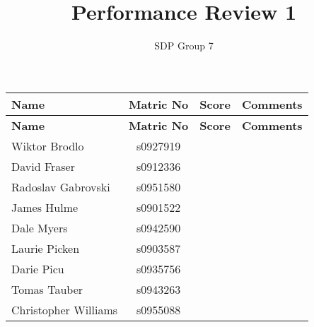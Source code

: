 \documentclass[10pt, a4paper]{article} %
\begin{document}
\title{Performance Review 1}
\author{SDP Group 7}
\maketitle

\begin{longtable}{l c c p{3cm}}
    \textbf{Name} &
    \textbf{Matric No} &
    \textbf{Score} &
    \textbf{Comments}\\
    \hline
    \endfirsthead


    \textbf{Name} &
    \textbf{Matric No} &
    \textbf{Score} &
    \textbf{Comments}\\
    \hline
    \endhead

    Wiktor Brodlo &
    s0927919 &
    &
    \\

    David Fraser &
    s0912336 &
    &
    \\

    Radoslav Gabrovski &
    s0951580 &
    & 
    \\

    James Hulme &
    s0901522 &
    & 
    \\

    Dale Myers &
    s0942590 &
    &
    \\

    Laurie Picken &
    s0903587 &
    &
    \\

    Darie Picu &
    s0935756 &
    &
    \\

    Tomas Tauber &
    s0943263 &
    &
    \\

    Christopher Williams &
    s0955088 &
    &
    \\


\end{longtable}
\end{document}
